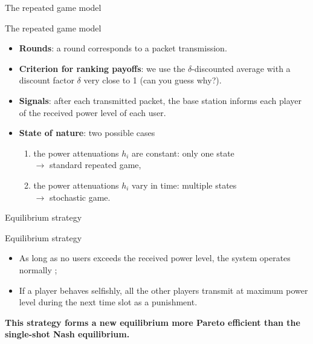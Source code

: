 \begin{frame}{The repeated game model}
    \begin{exampleblock}{The repeated game model}
        \begin{itemize}
            \pause
            \item \textbf{Rounds}: a round corresponds to a packet transmission.
            \pause
            \item \textbf{Criterion for ranking payoffs}: we use the $\delta$-discounted average with a
            discount factor $\delta$ very close to 1 (can you guess why?).
            \pause
            \item \textbf{Signals}: after each transmitted packet, the base station informs each player
            of the received power level of each user.
            \pause
            \item \textbf{State of nature}: two possible cases
            \begin{enumerate}
                \pause
                \item the power attenuations $h_i$ are constant: only one state\\
                $\to$ standard repeated game,
                \pause
                \item the power attenuations $h_i$ vary in time: multiple states\\
                $\to$ stochastic game.
            \end{enumerate}
        \end{itemize}
    \end{exampleblock}
\end{frame}


\begin{frame}{Equilibrium strategy}
    \begin{block}{Equilibrium strategy}
        \begin{itemize}
            \item As long as no users exceeds the received power level, the system operates normally ;
            \item If a player behaves selfishly, all the other players transmit at maximum power level
            during the next time slot as a punishment.
        \end{itemize}
    \end{block}

    \vspace{0.5cm}
    \textbf{{\color{green}This strategy forms a new equilibrium more Pareto efficient than the
    single-shot Nash equilibrium.}}
\end{frame}
